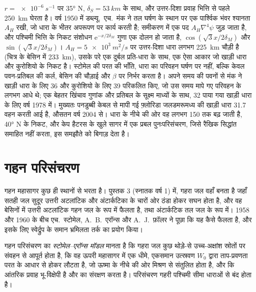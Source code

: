 $r = \qty{e-6}{s^{-1}}$ पर \ang{35} N, $\delta_S = \qty{53}{km}$ के साथ, और
उत्तर-दिशा प्रवाह भित्ति से पहले \qty{250}{km} घेरता है। वर्ष 1950 में
डब्ल्यू.~एच.~मंक ने तल घर्षण के स्थान पर एक पार्श्विक भंवर श्यानता $A_H$ रखी,
जो धारा के भीतर अपरूपण पर कार्य करती है; समीकरण में एक पद
$A_H\nabla^4\psi$ जुड़ जाता है, और पश्चिमी भित्ति के निकट संशोधन
$\mathrm e^{-x/2\delta_M}$ गुणा एक दोलन हो जाता है, $\cos(\sqrt3x/2\delta_M)$
और $\sin(\sqrt3x/2\delta_M)$। $A_H = \qty{5e3}{m^2/s}$ पर उत्तर-दिशा
धारा लगभग \qty{225}{km} चौड़ी है (चित्र के बेसिन में \qty{233}{km}),
उसके परे एक दुर्बल प्रति-धारा के साथ, एक ऐसा आकार जो खाड़ी धारा और
कुरोशियो के निकट है। स्टोमेल की परत की भाँति, धारा का परिवहन घर्षण पर
नहीं, बल्कि केवल पवन-प्रतिबल की कर्ल, बेसिन की
चौड़ाई और $\beta$ पर निर्भर करता है। अपने समय की पवनों से मंक ने
खाड़ी धारा के लिए \qty{36}{\sverdrup} और कुरोशियो के लिए \qty{39}{\sverdrup} परिकलित किए,
जो उस समय मापे गए परिवहन के लगभग आधे थे; एक बेहतर खिंचाव
गुणांक और प्रतिबल के सूक्ष्म माध्यों के साथ, \qty{32}{\sverdrup} पाया गया
खाड़ी धारा के लिए वर्ष 1978 में। मुख्यतः पनडुब्बी केबल से मापी गई
फ़्लोरिडा जलडमरूमध्य की खाड़ी धारा \qty{31.7}{\sverdrup} वहन करती आई है,
औसतन वर्ष 2004 से। धारा के नीचे की ओर वह लगभग \qty{150}{\sverdrup} तक बढ़ जाती है,
\ang{40} N के निकट, और केप हैटरस के खुले सागर में एक प्रबल पुनःपरिसंचरण, जिसे
रैखिक सिद्धांत समाहित नहीं करता, इस समझौते को बिगाड़ देता है।

\section{गहन परिसंचरण}\label{sec:b3:ocean-dynamics:abyssal}

गहन महासागर कुछ ही स्थानों से भरता है। पुस्तक 3 (स्नातक वर्ष 1) में, गहरा
जल वहाँ बनता है जहाँ सतही जल सुदूर उत्तरी अटलांटिक और अंटार्कटिका के चारों ओर ठंडा होकर सघन
होता है, और वह बेसिनों में उत्तरी अटलांटिक गहन जल के रूप में फैलता है,
तथा अंटार्कटिक तल जल के रूप में। 1958 और 1960 के बीच
एच.~स्टोमेल, A.~B.~एरॉन्स और A.~J.~फ़ॉलर ने पूछा कि यह कैसे फैलता है, और
इसके लिए स्वेर्द्रुप के समान भ्रमिलता तर्क का प्रयोग किया।

\begin{definition}[स्टोमेल--एरॉन्स मॉडल]\label{def:b3:ocean-dynamics:abyssal}
गहन परिसंचरण का \emph{स्टोमेल--एरॉन्स मॉडल}
मानता है कि गहरा जल कुछ थोड़े-से उच्च-अक्षांश स्रोतों पर संवहन से आपूर्त होता है,
कि वह ऊपरी महासागर में एक धीमे, एकसमान
उत्स्रवण $W_0$ द्वारा ताप-प्रवणता परत के आधार से होकर लौटता है, जो
ऊष्मा के नीचे की ओर मिश्रण से संतुलित होता है, और कि आंतरिक प्रवाह भू-विक्षेपी है
और  का संरक्षण करता है। परिसंचरण गहरी पश्चिमी सीमा
धाराओं से बंद होता है।
\end{definition}

